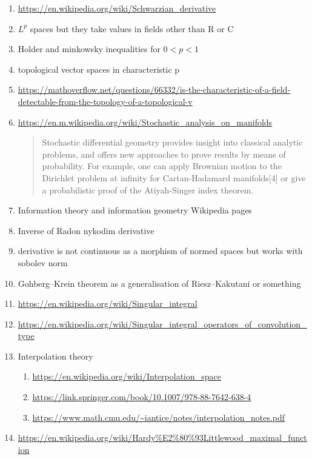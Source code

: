 \begin{enumerate}
    \item \url{https://en.wikipedia.org/wiki/Schwarzian_derivative}
    \item $L^p$ spaces but they take values in fields other than R or C
    \item Holder and minkowsky inequalities for $0\less p\less 1$
    \item topological vector spaces in characteristic p
    \item \url{https://mathoverflow.net/questions/66332/is-the-characteristic-of-a-field-detectable-from-the-topology-of-a-topological-v}
    \item \url{https://en.m.wikipedia.org/wiki/Stochastic_analysis_on_manifolds}
        \begin{quote}
            Stochastic differential geometry provides insight into classical analytic problems, and offers new approaches to prove results by means of probability. For example, one can apply Brownian motion to the Dirichlet problem at infinity for Cartan-Hadamard manifolds[4] or give a probabilistic proof of the Atiyah-Singer index theorem.
        \end{quote}
    \item Information theory and information geometry Wikipedia pages
    \item Inverse of Radon nykodim derivative
    \item derivative is not continuous as a morphism of normed spaces but works with sobolev norm
    \item Gohberg--Krein theorem as a generalisation of Riesz--Kakutani or something
    \item \url{https://en.wikipedia.org/wiki/Singular_integral}
    \item \url{https://en.wikipedia.org/wiki/Singular_integral_operators_of_convolution_type}
    \item Interpolation theory
        \begin{enumerate}
            \item \url{https://en.wikipedia.org/wiki/Interpolation_space}
            \item \url{https://link.springer.com/book/10.1007/978-88-7642-638-4}
            \item \url{https://www.math.cmu.edu/~iantice/notes/interpolation_notes.pdf}
        \end{enumerate}
    \item \url{https://en.wikipedia.org/wiki/Hardy\%E2\%80\%93Littlewood_maximal_function}

\end{enumerate}
